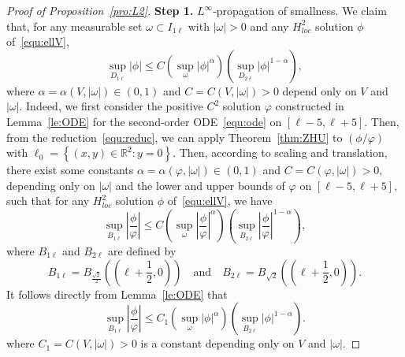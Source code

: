 \documentclass[a4paper,reqno]{amsart}
\theoremstyle{definition}
\numberwithin{equation}{section}
\newcommand{\R}{\mathbb{R}}
\def \R {{\mathbb{R} }}
\begin{document}
\begin{proof}[Proof of Proposition~\ref{pro:L2}]

\textbf{Step 1.} $L^{\infty}$-propagation of smallness. We claim that, for any measurable set $\omega\subset I_{1\ell}$ with $|\omega|>0$ and any $H_{loc}^{2}$ solution $\phi$ of~\eqref{equ:ellV},
\begin{equation}\label{est:Linfty}
\sup_{D_{1\ell}}|\phi|\le C\left(\sup_{\omega}|\phi|^{\alpha}\right)\left(\sup_{D_{2\ell}}|\phi|^{1-\alpha}\right),
\end{equation}
where $\alpha=\alpha(V,|\omega|)\in (0,1)$ and $C=C(V,|\omega|)>0$ depend only on $V$ and $|\omega|$.
Indeed, we first consider the positive $C^{2}$ solution $\varphi$ constructed in Lemma~\ref{le:ODE} for the second-order ODE~\eqref{equ:ode} on $[\ell-5,\ell+5]$.
Then, from the reduction~\eqref{equ:reduc}, we can apply Theorem~\ref{thm:ZHU} to $(\phi/\varphi)$ with $\ell_{0}=\left\{(x,y)\in \R^{2}:y=0\right\}$. Then, according to scaling and translation, there exist some constants $\alpha=\alpha(\varphi,|\omega|)\in (0,1)$ and $C=C(\varphi,|\omega|)>0$, depending only on $|\omega|$ and the lower and upper bounds of $\varphi$ on $[\ell-5,\ell+5]$, such that for any $H_{loc}^{2}$ solution $\phi$ of~\eqref{equ:ellV}, we have 
\begin{equation*}
\sup_{B_{1\ell}}\left|\frac{\phi}{\varphi}\right|\le C\left(\sup_{\omega}\left|\frac{\phi}{\varphi}\right|^{\alpha}\right)\left(\sup_{B_{2\ell}}\left|\frac{\phi}{\varphi}\right|^{1-\alpha}\right),
\end{equation*}
where $B_{1\ell}$ and $B_{2\ell}$ are defined by 
\begin{equation*}
B_{1\ell}=B_{\frac{\sqrt{2}}{2}} \left(\left(\ell+\frac{1}{2},0\right)\right)\quad \mbox{and}\quad 
B_{2\ell}=B_{\sqrt{2}}\left(\left(\ell+\frac{1}{2},0\right)\right).
\end{equation*}
It follows directly from Lemma~\ref{le:ODE} that 
\begin{equation*}
\sup_{B_{1\ell}}\left|\frac{\phi}{\varphi}\right|\le C_{1}\left(\sup_{\omega}\left|{\phi}\right|^{\alpha}\right)\left(\sup_{B_{2\ell}}\left|{\phi}\right|^{1-\alpha}\right).
\end{equation*}
where $C_{1}=C(V,|\omega|)>0$ is a constant depending only on $V$ and $|\omega|$.


\end{proof}
\end{document}
